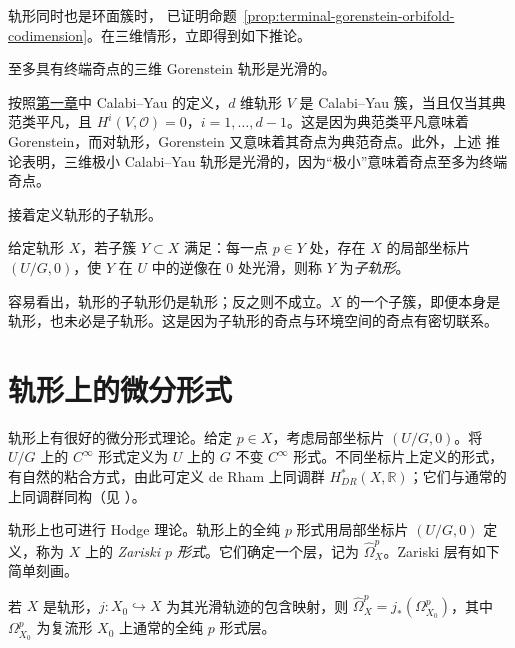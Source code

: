 轨形同时也是环面簇时， 已证明命题~\ref{prop:terminal-gorenstein-orbifold-codimension}。在三维情形，立即得到如下推论。
\begin{corollary}\label{cor:terminal-gorenstein-threefold-orbifold-smooth}
至多具有终端奇点的三维 Gorenstein 轨形是光滑的。
\end{corollary}

按照\hyperref[chap:introduction]{第一章}中 Calabi--Yau 的定义，$d$ 维轨形 $V$ 是 Calabi--Yau 簇，当且仅当其典范类平凡，且 $H^i(V,\mathcal O)=0$，$i=1,\ldots,d-1$。这是因为典范类平凡意味着 Gorenstein，而对轨形，Gorenstein 又意味着其奇点为典范奇点。此外，上述
推论表明，三维极小 Calabi--Yau 轨形是光滑的，因为“极小”意味着奇点至多为终端奇点。

接着定义轨形的子轨形。
\begin{definition}\label{def:suborbifold}
给定轨形 $X$，若子簇 $Y\subset X$ 满足：每一点 $p\in Y$ 处，存在 $X$ 的局部坐标片 $(U/G,0)$，使 $Y$ 在 $U$ 中的逆像在 $0$ 处光滑，则称 $Y$ 为\emph{子轨形}。
\end{definition}

容易看出，轨形的子轨形仍是轨形；反之则不成立。$X$ 的一个子簇，即便本身是轨形，也未必是子轨形。这是因为子轨形的奇点与环境空间的奇点有密切联系。

\section{轨形上的微分形式}\label{sec:orbifold-differential-forms}
轨形上有很好的微分形式理论。给定 $p\in X$，考虑局部坐标片 $(U/G,0)$。将 $U/G$ 上的 $C^\infty$ 形式定义为 $U$ 上的 $G$ 不变 $C^\infty$ 形式。不同坐标片上定义的形式，有自然的粘合方式，由此可定义 de Rham 上同调群 $H^*_{DR}(X,\mathbb R)$；它们与通常的上同调群同构（见 ）。

轨形上也可进行 Hodge 理论。轨形上的全纯 $p$ 形式用局部坐标片 $(U/G,0)$ 定义，称为 $X$ 上的 \emph{Zariski $p$ 形式}。它们确定一个层，记为 $\widehat\Omega_X^p$。Zariski 层有如下简单刻画。
\begin{proposition}\label{prop:zariski-forms-smooth-locus-pushforward}
若 $X$ 是轨形，$j:X_0\hookrightarrow X$ 为其光滑轨迹的包含映射，则 $\widehat\Omega_X^p=j_*(\Omega_{X_0}^p)$，其中 $\Omega_{X_0}^p$ 为复流形 $X_0$ 上通常的全纯 $p$ 形式层。
\end{proposition}

